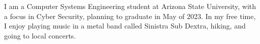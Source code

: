 

\begin{cvparagraph}

I am a Computer Systems Engineering student at Arizona State University, with a focus in Cyber Security, planning to graduate in May of 2023. In my free time, I enjoy playing music in a metal band called Sinistra Sub Dextra, hiking, and going to local concerts.
\end{cvparagraph}

